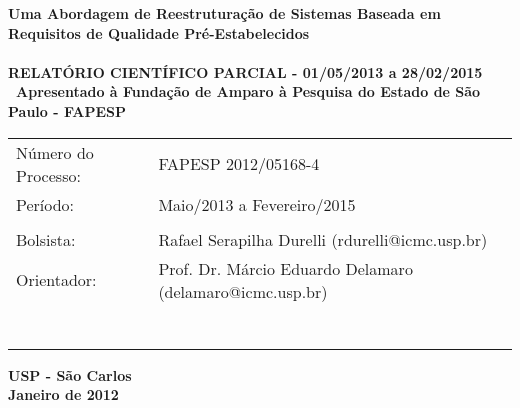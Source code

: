\documentclass[a4paper,11pt]{article}
\begin{document}
\begin{center}
\vspace*{1cm}
{\fontsize{17.28}{20}\sffamily\bfseries\selectfont Uma Abordagem de Reestruturação de Sistemas Baseada em Requisitos de Qualidade Pré-Estabelecidos \\\ \\

\small{RELATÓRIO CIENTÍFICO PARCIAL - 01/05/2013 a 28/02/2015}\\ \
\textsf{Apresentado à Fundação de Amparo à Pesquisa do Estado de São Paulo - FAPESP}
 \\
\vspace{3cm}}


\begin{table}[!th]
  \begin{center}
    \begin{tabular}{ll}

	  Número do Processo:      &   FAPESP 2012/05168-4     \\
      Período:        &  Maio/2013 a Fevereiro/2015                    \\
	                   &                                \\
      Bolsista:           &   Rafael Serapilha Durelli (rdurelli@icmc.usp.br)                                     \\
	  
	  \vspace{0.6cm}
      Orientador:        &  Prof. Dr. Márcio Eduardo Delamaro (delamaro@icmc.usp.br)                                           \\

	         &                              \\
	          &  \\
                       &                                  \\
       &                                       \\
              &                                             \\ \\
      \vspace{1cm}

    \end{tabular}
  \end{center}
\end{table}

\vfill
{\fontsize{18}{20}\sffamily\bfseries\selectfont USP - São Carlos \\ Janeiro de 2012}

\end{center}
\end{document}
